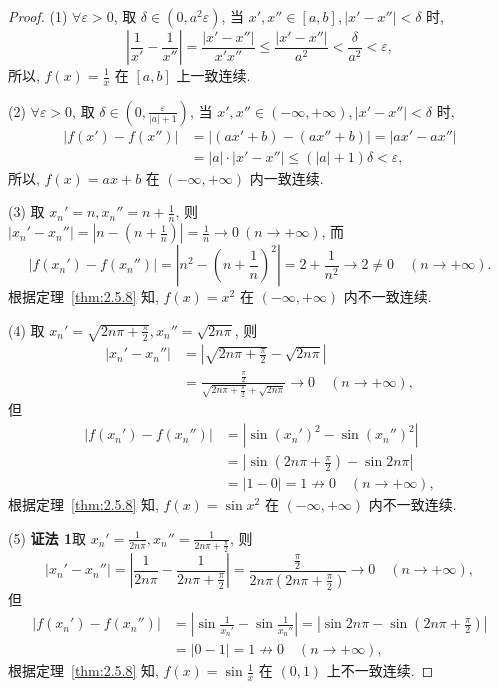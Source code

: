 \begin{proof}
(1) $\forall \varepsilon > 0$, 取 $\delta \in (0, a^2\varepsilon)$, 当 $x', x'' \in [a,b], |x' - x''| < \delta$ 时,
\[
\left|\frac{1}{x'} - \frac{1}{x''}\right| = \frac{|x' - x''|}{x'x''} \leqslant \frac{|x' - x''|}{a^2} < \frac{\delta}{a^2} < \varepsilon,
\]
所以, $f(x) = \frac{1}{x}$ 在 $[a,b]$ 上一致连续.

(2) $\forall \varepsilon > 0$, 取 $\delta \in \left(0, \frac{\varepsilon}{|a|+1}\right)$, 当 $x', x'' \in (-\infty, +\infty), |x' - x''| < \delta$ 时,
\[
\begin{aligned}
|f(x') - f(x'')| &= |(ax' + b) - (ax'' + b)| = |ax' - ax''| \\
&= |a| \cdot |x' - x''| \leqslant (|a| + 1)\delta < \varepsilon,
\end{aligned}
\]
所以, $f(x) = ax + b$ 在 $(-\infty, +\infty)$ 内一致连续.

(3) 取 $x_n' = n, x_n'' = n + \frac{1}{n}$, 则 $|x_n' - x_n''| = \left|n - \left(n + \frac{1}{n}\right)\right| = \frac{1}{n} \to 0\ (n \to +\infty)$, 而
\[
|f(x_n') - f(x_n'')| = \left|n^2 - \left(n + \frac{1}{n}\right)^2\right| = 2 + \frac{1}{n^2} \to 2 \neq 0 \quad (n \to +\infty).
\]
根据定理~\ref{thm:2.5.8} 知, $f(x) = x^2$ 在 $(-\infty, +\infty)$ 内不一致连续.

(4) 取 $x_n' = \sqrt{2n\pi + \frac{\pi}{2}}, x_n'' = \sqrt{2n\pi}$, 则
\[
\begin{aligned}
|x_n' - x_n''| &= \left|\sqrt{2n\pi + \frac{\pi}{2}} - \sqrt{2n\pi}\right| \\
&= \frac{\frac{\pi}{2}}{\sqrt{2n\pi + \frac{\pi}{2}} + \sqrt{2n\pi}} \to 0 \quad (n \to +\infty),
\end{aligned}
\]
但
\[
\begin{aligned}
|f(x_n') - f(x_n'')| &= |\sin(x_n')^2 - \sin(x_n'')^2| \\
&= \left|\sin\left(2n\pi + \frac{\pi}{2}\right) - \sin 2n\pi\right| \\
&= |1 - 0| = 1 \not\to 0 \quad (n \to +\infty),
\end{aligned}
\]
根据定理~\ref{thm:2.5.8} 知, $f(x) = \sin x^2$ 在 $(-\infty, +\infty)$ 内不一致连续.

(5) \textbf{证法 1}\quad 取 $x_n' = \frac{1}{2n\pi}, x_n'' = \frac{1}{2n\pi + \frac{\pi}{2}}$, 则
\[
|x_n' - x_n''| = \left|\frac{1}{2n\pi} - \frac{1}{2n\pi + \frac{\pi}{2}}\right| = \frac{\frac{\pi}{2}}{2n\pi\left(2n\pi + \frac{\pi}{2}\right)} \to 0 \quad (n \to +\infty),
\]
但
\[
\begin{aligned}
|f(x_n') - f(x_n'')| &= \left|\sin\frac{1}{x_n'} - \sin\frac{1}{x_n''}\right| = \left|\sin 2n\pi - \sin\left(2n\pi + \frac{\pi}{2}\right)\right| \\
&= |0 - 1| = 1 \not\to 0 \quad (n \to +\infty),
\end{aligned}
\]
根据定理~\ref{thm:2.5.8} 知, $f(x) = \sin\frac{1}{x}$ 在 $(0,1)$ 上不一致连续.


\end{proof}
